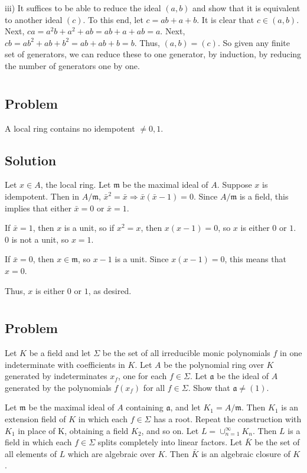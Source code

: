 \documentclass[book,12pt,oneside,openany]{memoir}
\begin{document}
iii) It suffices to be able to reduce the ideal $(a, b)$ and show that it is equivalent to another ideal $(c)$. To this end, let $c = ab + a + b$. It is clear that $c \in (a,b)$. Next, $ca = a^2b + a^2 + ab = ab + a + ab = a$. Next, $cb = ab^2 + ab + b^2 = ab + ab + b = b$. Thus, $(a,b) = (c)$. So given any finite set of generators, we can reduce these to one generator, by induction, by reducing the number of generators one by one.


\section{}
\subsection{Problem}
A local ring contains no idempotent $\neq 0,1$.
\subsection{Solution}
Let $x \in A$, the local ring. Let $\mathfrak{m}$ be the maximal ideal of $A$. Suppose $x$ is idempotent. Then in $A/\mathfrak{m}$, $\bar{x}^2 = \bar{x} \Rightarrow \bar{x} ( \bar{x} - 1) = 0$. Since $A/\mathfrak{m}$ is a field, this implies that either $\bar{x} = 0$ or $\bar{x} = 1$.

If $\bar{x} = 1$, then $x$ is a unit, so if $x^2 = x$, then $x(x - 1) = 0$, so $x$ is either $0$ or $1$. $0$ is not a unit, so $x = 1$.

If $\bar{x} = 0$, then $x \in \mathfrak{m}$, so $x - 1$ is a unit. Since $x(x - 1) = 0$, this means that $x = 0$.

Thus, $x$ is either $0$ or $1$, as desired.


\section{}
\subsection{Problem}
Let $K$ be a field and let $\Sigma$ be the set of all irreducible monic polynomials $f$ in one indeterminate with coefficients in $K$. Let $A$ be the polynomial ring over $K$ generated by indeterminates $x_f$, one for each $f \in \Sigma$. Let $\mathfrak{a}$ be the ideal of $A$ generated by the polynomials $f(x_f)$ for all $f \in \Sigma$. Show that $\mathfrak{a} \neq (1)$.

Let $\mathfrak{m}$ be the maximal ideal of $A$ containing $\mathfrak{a}$, and let $K_1 = A/\mathfrak{m}$. Then $K_1$ is an extension field of $K$ in which each $f \in \Sigma$ has a root. Repeat the construction with $K_1$ in place of K, obtaining a field $K_2$, and so on. Let $L = \cup_{n=1}^{\infty} K_n$. Then $L$ is a field in which each $f \in \Sigma$ splits completely into linear factors. Let $\bar{K}$ be the set of all elements of $L$ which are algebraic over $K$. Then $\bar{K}$ is an algebraic closure of $K$.
\end{document}
